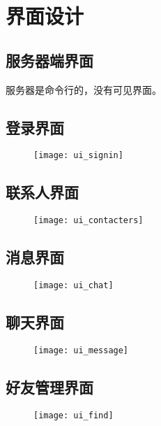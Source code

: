 \chapter{界面设计}
\section{服务器端界面}
服务器是命令行的，没有可见界面。

\section{登录界面}
\begin{figure}[!h]
	\centering
	\texttt{[image: ui\_signin]}
\end{figure}
\section{联系人界面}
\begin{figure}[!h]
	\centering
	\texttt{[image: ui\_contacters]}
\end{figure}
\section{消息界面}
\begin{figure}[!h]
	\centering
	\texttt{[image: ui\_chat]}
\end{figure}
\section{聊天界面}
\begin{figure}[!h]
	\centering
	\texttt{[image: ui\_message]}
\end{figure}
\section{好友管理界面}
\begin{figure}[!h]
	\centering
	\texttt{[image: ui\_find]}
\end{figure}